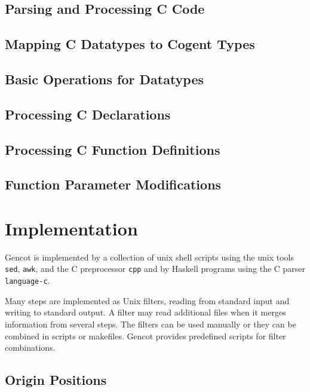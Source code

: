 \documentclass[a4paper]{report}
\newcommand{\code}[1]{\textnormal{\texttt{#1}}}
\begin{document}
\section{Parsing and Processing C Code}
\label{design-ccode}


\section{Mapping C Datatypes to Cogent Types}
\label{design-types}


\section{Basic Operations for Datatypes}
\label{design-operations}


\section{Processing C Declarations}
\label{design-decls}


\section{Processing C Function Definitions}
\label{design-fundefs}


\section{Function Parameter Modifications}
\label{design-parmod}


\chapter{Implementation}

Gencot is implemented by a collection of unix shell scripts using the unix tools \code{sed}, \code{awk}, and the 
C preprocessor \code{cpp} and by Haskell programs using the C parser \code{language-c}. 

Many steps are implemented as Unix filters, reading from standard input and writing to standard output. A filter
may read additional files when it merges information from several steps. The filters
can be used manually or they can be combined in scripts or makefiles. Gencot provides predefined scripts
for filter combinations.

\section{Origin Positions}
\label{impl-origin}

\end{document}
